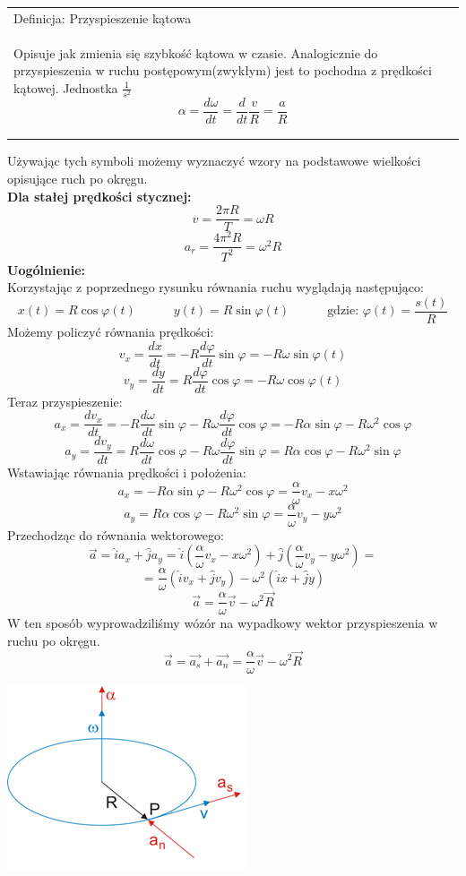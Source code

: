 \documentclass[a4paper]{article}
\newenvironment{definition}[2][Definicja]
    {
        \begin{center}
        \begin{tabular}{|p{1\textwidth}|}
        \hline
            #1: #2\\[2ex]
        \begin{em}
        \Large
    }
    { 
        \end{em}
        \\\hline
        \end{tabular} 
        \end{center}
    }
\begin{document}
    \begin{definition}{Przyspieszenie kątowa}
        Opisuje jak zmienia się szybkość kątowa w czasie. Analogicznie do przyspieszenia w ruchu
        postępowym(zwykłym) jest to pochodna z prędkości kątowej. Jednostka $\frac{1}{s^2}$
        \[\alpha = \frac{d \omega}{dt} = \frac{d}{dt}\frac{v}{R} = \frac{a}{R} \]
    \end{definition}
    Używając tych symboli możemy wyznaczyć wzory na podstawowe wielkości opisujące ruch po okręgu.\\
    \textbf{Dla stałej prędkości stycznej:}    
    \[v = \frac{2\pi R}{T} = \omega R\]
    \[a_r = \frac{4\pi^2 R}{T^2} = \omega^2 R\]
    \textbf{Uogólnienie:}\\
    Korzystając z poprzednego rysunku równania ruchu wyglądają następująco:
    \[x(t) = R\cos \varphi(t) \quad\qquad y(t) = R\sin \varphi(t) \quad\qquad \text{gdzie: } \varphi(t) = \frac{s(t)}{R}\]
    Możemy policzyć równania prędkości:
    \[v_x = \frac{dx}{dt} = -R \frac{d\varphi}{dt}\sin \varphi = -R \omega \sin \varphi(t) \]
    \[v_y = \frac{dy}{dt} = R \frac{d\varphi}{dt}\cos \varphi = -R \omega \cos \varphi(t) \]
    Teraz przyspieszenie:
    \[a_x = \frac{d v_x}{dt} = -R \frac{d \omega}{dt} \sin \varphi - R\omega \frac{d \varphi}{dt} \cos \varphi = 
    -R\alpha \sin \varphi - R\omega^2\cos \varphi \]
    \[a_y = \frac{d v_y}{dt} = R \frac{d \omega}{dt} \cos \varphi - R\omega \frac{d \varphi}{dt} \sin \varphi = 
    R\alpha \cos \varphi - R\omega^2\sin \varphi \]
    Wstawiając równania prędkości i położenia:
    \[a_x = -R\alpha \sin \varphi - R\omega^2\cos \varphi = \frac{\alpha}{\omega}v_x - x\omega^2\]
    \[a_y = R\alpha \cos \varphi - R\omega^2\sin \varphi = \frac{\alpha}{\omega}v_y - y\omega^2\]
    Przechodząc do równania wektorowego:
    \[\vec{a} = \hat{i}a_x + \hat{j}a_y = \hat{i} \left(\frac{\alpha}{\omega}v_x - x\omega^2 \right) 
    + \hat{j} \left(  \frac{\alpha}{\omega}v_y - y\omega^2 \right) = \]
    \[= \frac{\alpha}{\omega} \left( \hat{i}v_x + \hat{j}v_y \right) - \omega^2\left( \hat{i}x + \hat{j}y \right) \]
    \[\vec{a} = \frac{\alpha}{\omega}\vec{v} -\omega^2\vec{R}\]
    W ten sposób wyprowadziliśmy wózór na wypadkowy wektor przyspieszenia w ruchu po okręgu.
    \[\vec{a} = \vec{a_s} + \vec{a_n} = \frac{\alpha}{\omega}\vec{v} -\omega^2\vec{R}\]
    \begin{center}
        \includegraphics{img/ruchokrag3.png}
    \end{center}
\end{document}
